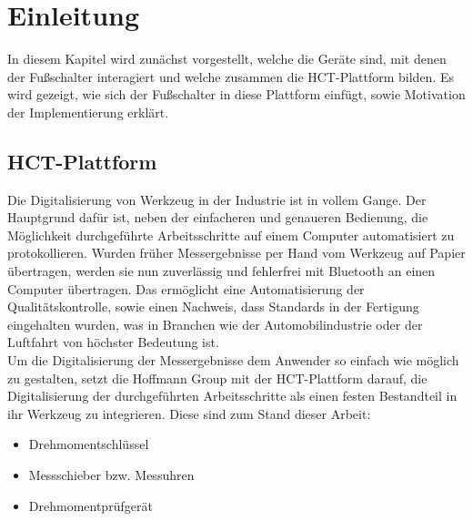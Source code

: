 \section{Einleitung}

In diesem Kapitel wird zunächst vorgestellt, welche die Geräte sind, mit denen der Fußschalter interagiert und welche zusammen die HCT-Plattform bilden. Es wird gezeigt, wie sich der Fußschalter in diese Plattform einfügt, sowie Motivation der Implementierung erklärt.

\subsection{HCT-Plattform}
Die Digitalisierung von Werkzeug in der Industrie ist in vollem Gange. Der Hauptgrund dafür ist, neben der einfacheren und genaueren Bedienung, die Möglichkeit durchgeführte Arbeitsschritte auf einem Computer automatisiert zu protokollieren. Wurden früher Messergebnisse per Hand vom Werkzeug auf Papier übertragen, werden sie nun zuverlässig und fehlerfrei mit Bluetooth an einen Computer übertragen. Das ermöglicht eine Automatisierung der Qualitätskontrolle, sowie einen Nachweis, dass Standards in der Fertigung eingehalten wurden, was in Branchen wie der Automobilindustrie oder der Luftfahrt von höchster Bedeutung ist. \\
Um die Digitalisierung der Messergebnisse dem Anwender so einfach wie möglich zu gestalten, setzt die Hoffmann Group mit der HCT-Plattform darauf, die Digitalisierung der durchgeführten Arbeitsschritte als einen festen Bestandteil in ihr Werkzeug zu integrieren. Diese sind zum Stand dieser Arbeit: 
\begin{itemize}
	\item Drehmomentschlüssel
	\item Messschieber bzw. Messuhren
	\item Drehmomentprüfgerät
\end{itemize}
